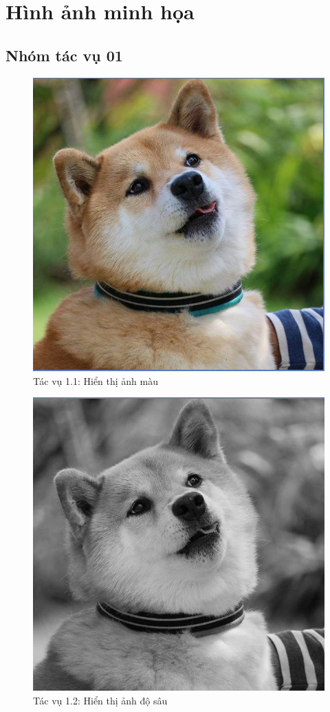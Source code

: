 \documentclass{article}
\begin{document}
\section{Hình ảnh minh họa}

	\subsection{Nhóm tác vụ 01}
		\begin{figure}[H]
			\centering
			\includegraphics[scale = 0.4]{11show}
			\caption{Tác vụ 1.1: Hiển thị ảnh màu}
		\end{figure}
		\begin{figure}[H]
			\centering
			\includegraphics[scale = 0.4]{12depth}
			\caption{Tác vụ 1.2: Hiển thị ảnh độ sâu}
		\end{figure}
\end{document}
